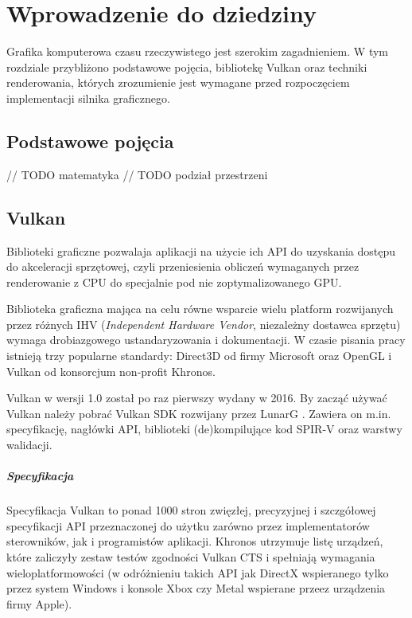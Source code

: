 \chapter{Wprowadzenie do dziedziny}
\label{chap:field}

Grafika komputerowa czasu rzeczywistego jest szerokim zagadnieniem.
W tym rozdziale przybliżono podstawowe pojęcia, bibliotekę Vulkan oraz techniki renderowania, których zrozumienie jest wymagane przed rozpoczęciem implementacji silnika graficznego.

\section{Podstawowe pojęcia}
// TODO matematyka
// TODO podział przestrzeni

\section{Vulkan}

Biblioteki graficzne pozwalaja aplikacji na użycie ich API do uzyskania dostępu do akceleracji sprzętowej, czyli przeniesienia obliczeń wymaganych przez renderowanie z CPU do specjalnie pod nie zoptymalizowanego GPU.

Biblioteka graficzna mająca na celu równe wsparcie wielu platform rozwijanych przez różnych IHV (\textit{Independent Hardware Vendor}, niezależny dostawca sprzętu) wymaga drobiazgowego ustandaryzowania i dokumentacji.
W czasie pisania pracy istnieją trzy popularne standardy: Direct3D od firmy Microsoft oraz OpenGL i Vulkan od konsorcjum non-profit Khronos.

Vulkan w wersji 1.0 został po raz pierwszy wydany w 2016. By zacząć używać Vulkan należy pobrać Vulkan SDK rozwijany przez LunarG \cite{VULKANSDK}.
Zawiera on m.in. specyfikację, nagłówki API, biblioteki (de)kompilujące kod SPIR-V oraz warstwy walidacji.

\paragraph{Specyfikacja}

Specyfikacja Vulkan \cite{VULKANSPEC} to ponad 1000 stron zwięzłej, precyzyjnej i szczgółowej specyfikacji API przeznaczonej do użytku zarówno przez implementatorów sterowników, jak i programistów aplikacji. Khronos utrzymuje listę urządzeń, które zaliczyły zestaw testów zgodności Vulkan CTS \cite{VULKANCTS} i spełniają wymagania wieloplatformowości (w odróżnieniu takich API jak DirectX wspieranego tylko przez system Windows i konsole Xbox \cite{HughesDamEtAl13} czy Metal wspierane przeez urządzenia firmy Apple).

